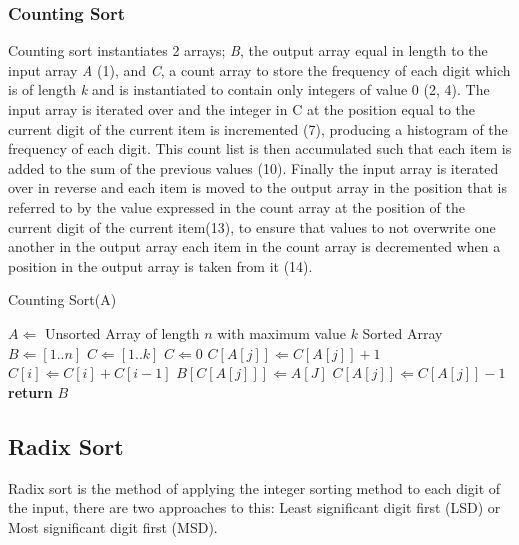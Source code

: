 \documentclass[12pt]{article}
\begin{document}
	\pagebreak
	\subsubsection{Counting Sort}
	Counting sort instantiates 2 arrays; \textit{B}, the output array equal in length to the input array \textit{A} (1), and \textit{C}, a count array to store the frequency of each digit which is of length \textit{k} and is instantiated to contain only integers of value 0 (2, 4). The input array is iterated over and the integer in C at the position equal to the current digit of the current item is incremented (7), producing a histogram of the frequency of each digit. This count list is then accumulated such that each item is added to the sum of the previous values (10). Finally the input array is iterated over in reverse and each item is moved to the output array in the position that is referred to by the value expressed in the count array at the position of the current digit of the current item(13), to ensure that values to not overwrite one another in the output array each item in the count array is decremented when a position in the output array is taken from it (14).
	\begin{algorithm}[H] %
		\caption{Counting Sort({A})} %
		\label{alg2} %
		\begin{algorithmic}[1] %
			\REQUIRE $A \Leftarrow$ Unsorted Array of length $n$ with maximum value $k$
			\ENSURE Sorted Array
			\STATE $B \Leftarrow [1..n]$ 
			\STATE $C \Leftarrow [1..k]$ 
				\STATE $C \Leftarrow 0$
			\ENDFOR
				\STATE $C[A[j]] \Leftarrow C[A[j]] + 1$ 
			\ENDFOR
				\STATE $C[i] \Leftarrow C[i] + C[i-1]$
			\ENDFOR
				\STATE $B[C[A[j]]] \Leftarrow A[J]$ 
				\STATE $C[A[j]] \Leftarrow C[A[j]] - 1$ 
			\ENDFOR
			\STATE \textbf{return} $B$
		\end{algorithmic}
	\end{algorithm}	
	\pagebreak
	\subsection{Radix Sort}
	Radix sort is the method of applying the integer sorting method to each digit of the input, there are two approaches to this: Least significant digit first (LSD) or Most significant digit first (MSD).
\end{document}
